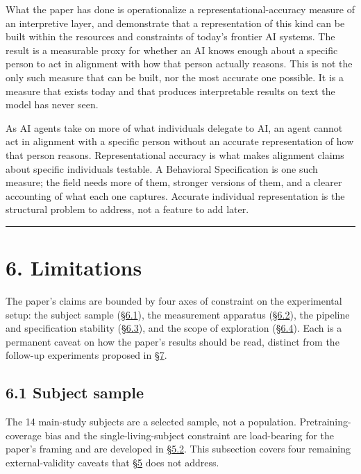 What the paper has done is operationalize a representational-accuracy
measure of an interpretive layer, and demonstrate that a representation
of this kind can be built within the resources and constraints of
today's frontier AI systems. The result is a measurable proxy for
whether an AI knows enough about a specific person to act in alignment
with how that person actually reasons. This is not the only such measure
that can be built, nor the most accurate one possible. It is a measure
that exists today and that produces interpretable results on text the
model has never seen.

As AI agents take on more of what individuals delegate to AI, an agent
cannot act in alignment with a specific person without an accurate
representation of how that person reasons. Representational accuracy is
what makes alignment claims about specific individuals testable. A
Behavioral Specification is one such measure; the field needs more of
them, stronger versions of them, and a clearer accounting of what each
one captures. Accurate individual representation is the structural
problem to address, not a feature to add later.

\begin{center}\rule{0.5\linewidth}{0.5pt}\end{center}

\hypertarget{limitations}{%
\section{6. Limitations}\label{limitations}}

The paper's claims are bounded by four axes of constraint on the
experimental setup: the subject sample (\hyperref[subject-sample]{§6.1}), the measurement apparatus
(\hyperref[measurement-apparatus]{§6.2}), the pipeline and specification stability (\hyperref[pipeline-and-specification-stability]{§6.3}), and the scope
of exploration (\hyperref[scope-of-exploration]{§6.4}). Each is a permanent caveat on how the paper's
results should be read, distinct from the follow-up experiments proposed
in \hyperref[future-work]{§7}.

\hypertarget{subject-sample}{%
\subsection{6.1 Subject sample}\label{subject-sample}}

The 14 main-study subjects are a selected sample, not a population.
Pretraining-coverage bias and the single-living-subject constraint are
load-bearing for the paper's framing and are developed in \hyperref[why-the-gradient-is-the-load-bearing-finding]{§5.2}. This
subsection covers four remaining external-validity caveats that \hyperref[discussion]{§5} does
not address.

